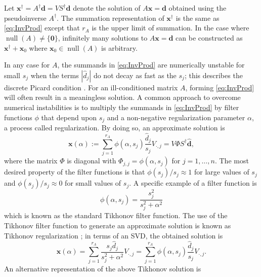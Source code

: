 \documentclass[12pt]{article}
\newcommand{\rA}{r_A}	%
\newcommand{\dVec}{\mathbf{d}}	%
\newcommand{\xVec}{\mathbf{x}}	%
\newcommand{\pinv}[1]{{#1}^\dagger}	%
\DeclareMathOperator{\nullspace}{null}	%
\newcommand{\regparam}{\alpha}  %
\newcommand{\filt}{\phi}
\newcommand{\zeroVec}{\bm{0}}	%
\newcommand{\singular}{s}	%
\newcommand{\svd}[1]{\widehat{#1}}	%
\begin{document}
Let $\pinv{\xVec} = \pinv{A}\dVec = V\pinv{S}\svd{\dVec}$ denote the solution of $A\xVec = \dVec$ obtained using the pseudoinverse $\pinv{A}$. The summation representation of $\pinv{\xVec}$ is the same as \eqref{eq:InvProd} except that $\rA$ is the upper limit of summation. In the case where $\nullspace(A) \neq \{\zeroVec\}$, infinitely many solutions to $A\xVec = \dVec$ can be constructed as $\pinv{\xVec} + \xVec_0$ where $\xVec_0 \in \nullspace(A)$ is arbitrary. \par
In any case for $A$, the summands in \eqref{eq:InvProd} are numerically unstable for small $\singular_j$ when the terms $\left|\svd{d}_j\right|$ do not decay as fast as the $\singular_j$; this describes the discrete Picard condition \cite{Hansen:98}. For an ill-conditioned matrix $A$, forming \eqref{eq:InvProd} will often result in a meaningless solution. A common approach to overcome numerical instabilities is to multiply the summands in \eqref{eq:InvProd} by filter functions $\filt$ that depend upon $\singular_j$ and a non-negative regularization parameter $\regparam$, a process called regularization. By doing so, an approximate solution is
\begin{equation}
\label{eq:ApproxSol}
\xVec(\regparam) := \sum_{j=1}^{\rA} \filt(\regparam,\singular_j) \frac{\svd{d}_j}{\singular_j}V_{\cdot,j}  = V\Phi{S}^\dagger\svd{\dVec},
\end{equation}
where the matrix $\Phi$ is diagonal with $\Phi_{j,j} = \filt(\regparam,\singular_j)$ for $j = 1,\ldots,{n}$. The most desired property of the filter functions is that $\filt(\singular_j)/\singular_j \approx 1$  for large values of $\singular_j$ and $\filt(\singular_j)/\singular_j \approx 0$ for small values of $\singular_j$. A specific example of a filter function is
\begin{equation}
\label{eq:TikFilt}
\filt(\regparam,\singular_j)  = \frac{\singular_j^2}{\singular_j^2 + \regparam^2}
\end{equation}
which is known as the standard Tikhonov filter function. The use of the Tikhonov filter function to generate an approximate solution is known as Tikhonov regularization \cite{Tikh1963}; in terms of an SVD, the obtained solution is
\begin{equation}
\label{eq:TikSol}
\xVec(\regparam) = \sum_{j = 1}^{\rA} \frac{\singular_j \svd{d}_j}{\singular_j^2 + \regparam^2}V_{\cdot,j} = \sum_{j = 1}^{\rA} \filt(\regparam,\singular_j)\frac{\svd{d}_j}{\singular_j}V_{\cdot,j}.
\end{equation}
An alternative representation of the above Tikhonov solution is
\end{document}
